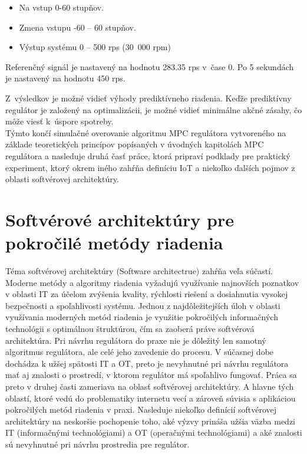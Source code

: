 \begin{itemize}
\item
  Na vstup 0-60 stupňov.
\item
  Zmena vstupu -60 -- 60 stupňov.
\item
  Výstup systému 0 -- 500 rps (30~000 rpm)
\end{itemize}

Referenčný signál je nastavený na hodnotu 283.35 rps v~čase 0. Po 5
sekundách je nastavený na hodnotu 450 rps.

Z~výsledkov je možné vidieť výhody prediktívneho riadenia. Keďže
prediktívny regulátor je založený na optimalizácii, je možné vidieť
minimálne akčné zásahy, čo môže viesť k~úspore spotreby.\cite{MPC08}\\
Týmto končí simulačné overovanie algoritmu MPC regulátora vytvoreného na základe teoretických princípov popísaných v úvodných kapitolách MPC regulátora a nasleduje druhá časť práce, ktorá pripraví podklady pre  praktický experiment, ktorý okrem iného zahŕňa definíciu IoT a niekoľko ďalších pojmov z oblasti softvérovej architektúry.

\section{Softvérové architektúry pre pokročilé metódy riadenia}
Téma softvérovej architektúry (Software architectrue) zahŕňa veľa súčastí. Moderne metódy a algoritmy riadenia vyžadujú využívanie najnovších poznatkov v oblasti IT za účelom zvýšenia kvality, rýchlosti riešení a dosiahnutia vysokej bezpečnosti a spoľahlivosti systému. Jednou z najdôležitejších úloh v oblasti využívania moderných metód riadenia je využitie pokročilých informačných technológii s optimálnou štruktúrou, čím sa zaoberá práve softvérová architektúra. Pri návrhu regulátora do praxe nie je dôležitý len samotný algoritmus regulátora, ale celé jeho zavedenie do procesu. V súčasnej dobe dochádza k užšej spätosti IT a OT, preto je nevyhnutné pri návrhu regulátora mať aj znalosti o prostredí, v ktorom regulátor má spoľahlivo fungovať. Práca sa preto v druhej časti zameriava na oblasť softvérovej architektúry. A hlavne tých oblastí, ktoré vedú do problematiky internetu vecí a zároveň súvisia s aplikáciou pokročilých metód riadenia v praxi. Nasleduje niekoľko definícií softvérovej architektúry na neskoršie pochopenie toho, aké výzvy prináša užšia väzba medzi IT (informačnými technológiami) a OT (operačnými technológiami) a aké znalosti sú nevyhnutné pri návrhu prostredia pre regulátor.

